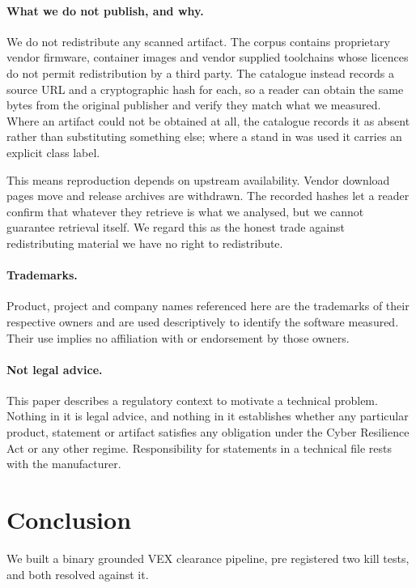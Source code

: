 \paragraph{What we do not publish, and why.} We do not redistribute any scanned
artifact. The corpus contains proprietary vendor firmware, container images and
vendor supplied toolchains whose licences do not permit redistribution by a third
party. The catalogue instead records a source URL and a cryptographic hash for
each, so a reader can obtain the same bytes from the original publisher and
verify they match what we measured. Where an artifact could not be obtained at
all, the catalogue records it as absent rather than substituting something else;
where a stand in was used it carries an explicit class label.

This means reproduction depends on upstream availability. Vendor download pages
move and release archives are withdrawn. The recorded hashes let a reader confirm
that whatever they retrieve is what we analysed, but we cannot guarantee
retrieval itself. We regard this as the honest trade against redistributing
material we have no right to redistribute.

\paragraph{Trademarks.} Product, project and company names referenced here are
the trademarks of their respective owners and are used descriptively to identify
the software measured. Their use implies no affiliation with or endorsement by
those owners.

\paragraph{Not legal advice.} This paper describes a regulatory context to
motivate a technical problem. Nothing in it is legal advice, and nothing in it
establishes whether any particular product, statement or artifact satisfies any
obligation under the Cyber Resilience Act or any other regime. Responsibility for
statements in a technical file rests with the manufacturer.

\section{Conclusion}

We built a binary grounded VEX clearance pipeline, pre registered two kill tests,
and both resolved against it.

